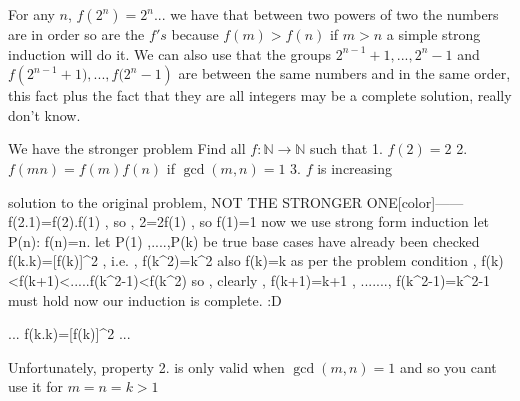 \begin{solution}
	For any $n$, $f(2^{n}) = 2^{n}$... we have that between two powers of two the numbers are in order so are the $f's$ because $ f(m)>f(n) $ if $ m>n $ a simple strong induction will do it. We can also use that the groups {${2^{n-1} +1, ... , 2^{n} - 1}$} and {$f({2^{n-1} +1), ... , f(2^{n} - 1})$} are between the same numbers and in the same order, this fact plus the fact that they are all integers may be a complete solution, really don't know.
\end{solution}



\begin{solution}
	We have the stronger problem 
Find all $f: \mathbb{N} \to \mathbb{N}$ such that
1. $f(2)=2$
2. $f(mn)=f(m)f(n)$ if $\gcd(m,n)=1$
3. $f$ is increasing
\end{solution}



\begin{solution}solution to the original problem, NOT THE STRONGER ONE[\/color]------f(2.1)=f(2).f(1) , so , 2=2f(1) , so f(1)=1 
now we use strong form induction
let P(n): f(n)=n.
let P(1) ,....,P(k) be true { base cases have already been checked}
f(k.k)=[f(k)]^2 , i.e. , f(k^2)=k^2 also f(k)=k
as per the problem condition , f(k)<f(k+1)<.....f(k^2-1)<f(k^2)
so , clearly , f(k+1)=k+1 , ......., f(k^2-1)=k^2-1 must hold
now our induction is complete. :D
\end{solution}



\begin{solution}
	\begin{tcolorbox}... f(k.k)=[f(k)]^2 ...\end{tcolorbox}
Unfortunately, property 2. is only valid when $\gcd(m,n)=1$ and so you cant use it for $m=n=k>1$
\end{solution}







